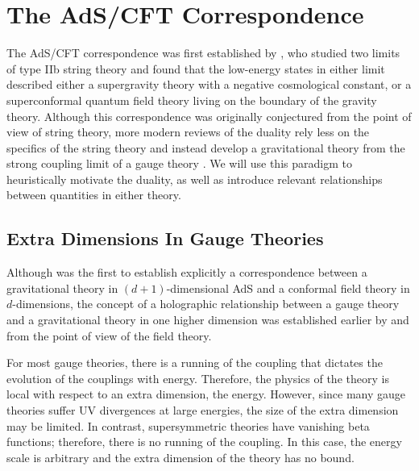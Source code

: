 \documentclass[../PhD.tex]{subfiles}
\begin{document}

\section{The AdS/CFT Correspondence}
\label{sec: ads/cft}

The AdS/CFT correspondence was first established by \cite{hep-th/9711200}, who studied two limits of type IIb string theory and found that the low-energy states in either limit described either a supergravity theory with a negative cosmological constant, or a superconformal quantum field theory living on the boundary of the gravity theory. Although this correspondence was originally conjectured from the point of view of string theory, more modern reviews of the duality rely less on the specifics of the string theory and instead develop a gravitational theory from the strong coupling limit of a gauge theory \cite{gr-qc/0602037}. We will use this paradigm to heuristically motivate the duality, as well as introduce relevant relationships between quantities in either theory.  


\subsection{Extra Dimensions In Gauge Theories}
\label{ssec: extra dims in gauge theories}

Although \cite{hep-th/9711200} was the first to establish explicitly a correspondence between a gravitational theory in $(d+1)$-dimensional AdS and a conformal field theory in $d$-dimensions, the concept of a holographic relationship between a gauge theory and a gravitational theory in one higher dimension was established earlier by \cite{gr-qc/9310026} and \cite{hep-th/9409089} from the point of view of the field theory. 

For most gauge theories, there is a running of the coupling that dictates the evolution of the couplings with energy. Therefore, the physics of the theory is local with respect to an extra dimension, the energy. However, since many gauge theories suffer UV divergences at large energies, the size of the extra dimension may be limited. In contrast, supersymmetric theories have vanishing beta functions; therefore, there is no running of the coupling. In this case, the energy scale is arbitrary and the extra dimension of the theory has no bound.
\end{document}

